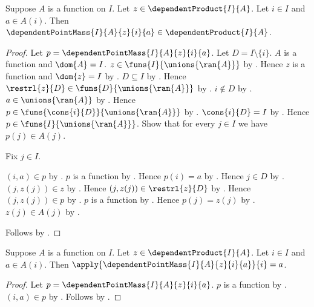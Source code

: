 \begin{proposition}\label{dependent_point_mass_type}
    Suppose $A$ is a function on $I$.
    Let $z\in\dependentProduct{I}{A}$.
    Let $i\in I$ and $a\in A(i)$.
    Then
        $\dependentPointMass{I}{A}{z}{i}{a}
            \in\dependentProduct{I}{A}$.
\end{proposition}
\begin{proof}
    Let $p=\dependentPointMass{I}{A}{z}{i}{a}$.
    Let $D=I\setminus\{i\}$.
    $A$ is a function and $\dom{A}=I$.
    $z\in\funs{I}{\unions{\ran{A}}}$ by
        .
    Hence $z$ is a function and $\dom{z}=I$ by
        .
    $D\subseteq I$ by .
    Hence $\restrl{z}{D}\in
        \funs{D}{\unions{\ran{A}}}$ by .
    $i\notin D$ by .
    $a\in\unions{\ran{A}}$ by
        .
    Hence
        $p\in\funs{\cons{i}{D}}{\unions{\ran{A}}}$ by
        .
    $\cons{i}{D}=I$ by .
    Hence $p\in\funs{I}{\unions{\ran{A}}}$.
    Show that for every $j\in I$ we have $p(j)\in A(j)$.
    \begin{subproof}
        Fix $j\in I$.
        \begin{byCase}
            $(i,a)\in p$ by
                .
            $p$ is a function by .
            Hence $p(i)=a$ by .
            Hence $j\in D$ by .
            $(j,z(j))\in z$ by .
            Hence $(j,z(j))\in\restrl{z}{D}$ by
                .
            Hence $(j,z(j))\in p$ by
                .
            $p$ is a function by .
            Hence $p(j)=z(j)$ by .
            $z(j)\in A(j)$ by
                .
        \end{byCase}
    \end{subproof}
    Follows by .
\end{proof}

\begin{proposition}\label{dependent_point_mass_selected}
    Suppose $A$ is a function on $I$.
    Let $z\in\dependentProduct{I}{A}$.
    Let $i\in I$ and $a\in A(i)$.
    Then $\apply{\dependentPointMass{I}{A}{z}{i}{a}}{i}=a$.
\end{proposition}
\begin{proof}
    Let $p=\dependentPointMass{I}{A}{z}{i}{a}$.
    $p$ is a function by
        .
    $(i,a)\in p$ by
        .
    Follows by .
\end{proof}

